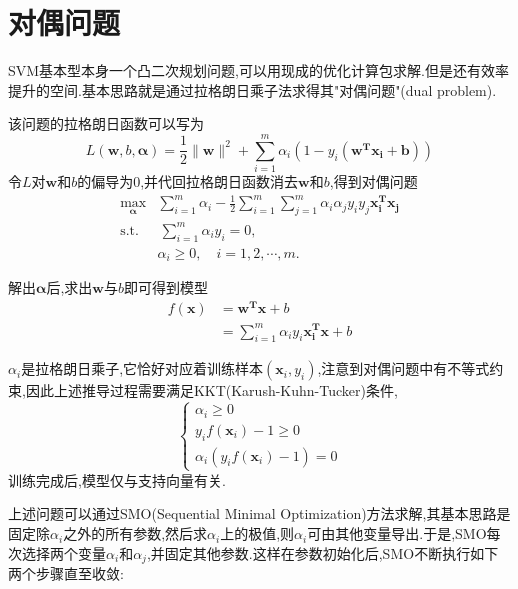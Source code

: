 \section{对偶问题}

SVM基本型本身一个凸二次规划问题,可以用现成的优化计算包求解.但是还有效率提升的空间.基本思路就是通过拉格朗日乘子法求得其"对偶问题"(dual problem).

该问题的拉格朗日函数可以写为
\begin{equation}L(\mathbf w, b, \mathbf\alpha)=\frac{1}{2}\|\mathbf w\|^2+\sum_{i=1}^m\alpha_i(1-y_i(\mathbf{w^Tx_i+b}))\end{equation}
令$L$对$\mathbf w$和$b$的偏导为$0$,并代回拉格朗日函数消去$\mathbf w$和$b$,得到对偶问题
\begin{equation}\begin{split}
\max_{\mathbf\alpha}&\sum_{i=1}^m\alpha_i-\frac{1}{2}\sum_{i=1}^m\sum_{j=1}^m\alpha_i\alpha_jy_iy_j\mathbf{x_i^Tx_j}\\
\text{s.t.}&\,\sum_{i=1}^m\alpha_iy_i=0,\\
&\alpha_i\ge 0,\quad i=1,2,\cdots,m.
\end{split}\end{equation}

解出$\mathbf\alpha$后,求出$\mathbf w$与$b$即可得到模型
\begin{equation}\begin{split}
f(\mathbf x)&=\mathbf{w^Tx}+b\\
&=\sum_{i=1}^m\alpha_iy_i\mathbf{x_i^Tx}+b
\end{split}\end{equation}

$\alpha_i$是拉格朗日乘子,它恰好对应着训练样本$(\mathbf x_i,y_i)$,注意到对偶问题中有不等式约束,因此上述推导过程需要满足KKT(Karush-Kuhn-Tucker)条件,
\begin{equation}\left\{\begin{array}{ll}
\alpha_i\ge 0\\
y_if(\mathbf x_i)-1\ge 0\\
\alpha_i(y_if(\mathbf x_i)-1)=0
\end{array}\right.\end{equation}
训练完成后,模型仅与支持向量有关.

上述问题可以通过SMO(Sequential Minimal Optimization)方法求解,其基本思路是固定除$\alpha_i$之外的所有参数,然后求$\alpha_i$上的极值,则$\alpha_i$可由其他变量导出.于是,SMO每次选择两个变量$\alpha_i$和$\alpha_j$,并固定其他参数.这样在参数初始化后,SMO不断执行如下两个步骤直至收敛:

